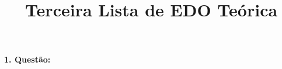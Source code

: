 \documentclass[a4paper,12pt]{article}
\title{ Terceira Lista de EDO Te\'orica}
\date{\vspace{-5ex}}
\begin{document}
\maketitle\thispagestyle{fancy}
\textbf{1. Quest\~ao:}\\
\end{document}
